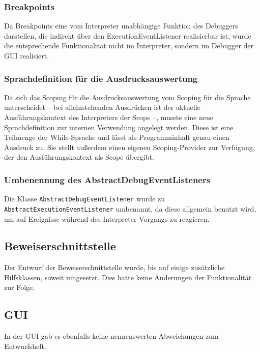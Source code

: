 \subsubsection{Breakpoints\label{aenderung_interpreter_breakpoints}}
Da Breakpoints eine vom Interpreter unabhängige Funktion des Debuggers darstellen, die indirekt über den ExecutionEventListener realisierbar ist, wurde die entsprechende Funktionalität nicht im Interpreter, sondern im Debugger der GUI realisiert.

\subsubsection{Sprachdefinition für die Ausdrucksauswertung}
Da sich das Scoping für die Ausdrucksauswertung vom Scoping für die Sprache unterscheidet -- bei alleinstehenden Ausdrücken ist der aktuelle Ausführungskontext des Interpreters der Scope --, musste eine neue Sprachdefinition zur internen Verwendung angelegt werden. Diese ist eine Teilmenge der While-Sprache und lässt als Programminhalt genau einen Ausdruck zu. Sie stellt außerdem einen eigenen Scoping-Provider zur Verfügung, der den Ausführungskontext als Scope übergibt.

\subsubsection{Umbenennung des AbstractDebugEventListeners}
Die Klasse \texttt{AbstractDebugEventListener} wurde zu \\ \texttt{AbstractExecutionEventListener} umbenannt, da diese allgemein benutzt wird, um auf Ereignisse während des Interpreter-Vorgangs zu reagieren.

\subsection{Beweiserschnittstelle}
Der Entwurf der Beweiserschnittstelle wurde, bis auf einige zusätzliche Hilfsklassen, soweit umgesetzt. Dies hatte keine Änderungen der Funktionalität zur Folge.

\subsection{GUI}
In der GUI gab es ebenfalls keine nennenswerten Abweichungen zum Entwurfsheft.
